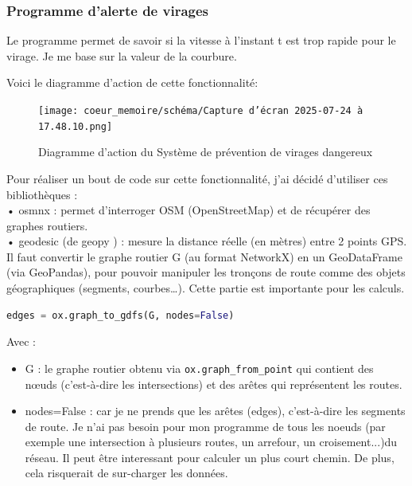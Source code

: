 \subsubsection{Programme d'alerte de virages}
Le programme permet de savoir si la vitesse à l'instant t est trop rapide pour le virage. Je me base sur la valeur de la courbure.

Voici le diagramme d'action de cette fonctionnalité:\\

\begin{figure}[H]
    \centering
    \texttt{[image: coeur\_memoire/schéma/Capture d’écran 2025-07-24 à 17.48.10.png]} 
    \caption{Diagramme d'action du Système de prévention de virages dangereux}
\end{figure}

Pour réaliser un bout de code sur cette fonctionnalité, j'ai décidé d'utiliser ces bibliothèques :\\
• osmnx\cite{osm_doc} : permet d’interroger OSM (OpenStreetMap) et de récupérer des graphes routiers.\\
•	geodesic (de geopy \cite{geopy}) : mesure la distance réelle (en mètres) entre 2 points GPS.\\

Il faut convertir le graphe routier G (au format NetworkX) en un GeoDataFrame (via GeoPandas), pour pouvoir manipuler les tronçons de route comme des objets géographiques (segments, courbes…). Cette partie est importante pour les calculs.
\begin{lstlisting}[language=Python, caption={Conversion du graphe routier}]
edges = ox.graph_to_gdfs(G, nodes=False)
\end{lstlisting}
Avec : \\
\begin{itemize}
    \item G : le graphe routier obtenu via \texttt{ox.graph\_from\_point} qui contient des nœuds (c'est-à-dire les intersections) et des arêtes qui représentent les routes.
    \item nodes=False : car je ne prends que les arêtes (edges), c’est-à-dire les segments de route. Je n'ai pas besoin pour mon programme de tous les noeuds (par exemple une intersection à plusieurs routes, un arrefour, un croisement...)du réseau. Il peut être interessant pour calculer un plus court chemin. De plus, cela risquerait de sur-charger les données.
\end{itemize}


